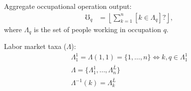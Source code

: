 {\begin{axiom}
        Aggregate occupational operation output:
        \begin{align}
            \mho_{q} 
            &= 
            \left\lfloor
            \sum_{k=1}^{n}
                [k \in {\Lambda}_q]
                ?
            \right\rfloor
            ,
        \end{align}
        where ${\Lambda}_q$ is the set of people working in occupation $q$.

        Labor market taxa ($\Lambda$):
        \begin{gather}
            \Lambda_{1}^{1}
            = \Lambda(1,1)
            = \{
                1, \dots, n
                \}
            \iff k, q \in 
            \Lambda_{1}^{1}
            \\
            \Lambda = \{
                \Lambda_{1}^{1},
                \dots,
                \Lambda_{n}^{\bar{L}}
                \}
            \\
            \Lambda^{-1}(k) = \Lambda_{k}^{\bar{L}}
        \end{gather}

    \end{axiom}

}


\newcommand{\OCL}{
    \label{ocl}

    \begin{lemma}[Occupational Composition Lemma]
        Skill sets are composable to accomplish occupations' operations.
    \end{lemma}

    \begin{proof}

    \end{proof}

}

